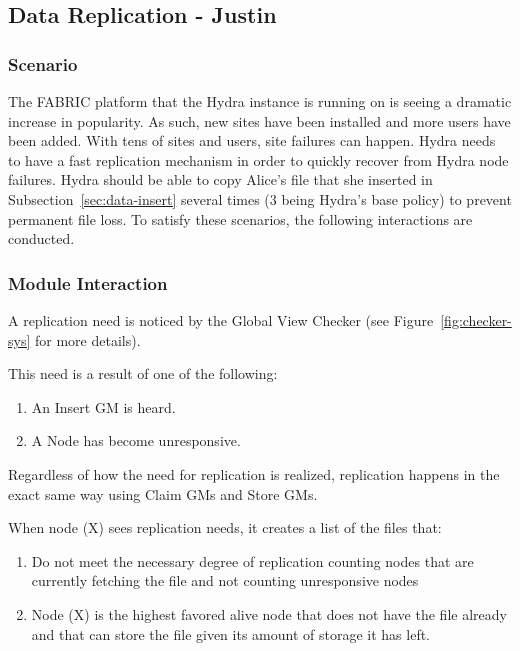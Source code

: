 \subsection{Data Replication - Justin} \label{sec:data-replicate}


\subsubsection{Scenario}
The FABRIC platform that the Hydra instance is running on is seeing a dramatic increase in popularity. As such, new sites have been installed and more users have been added. With tens of sites and users, site failures can happen.
Hydra needs to have a fast replication mechanism in order to quickly recover from Hydra node failures.
Hydra should be able to copy Alice's file that she inserted in Subsection~\ref{sec:data-insert} several times (3 being Hydra's base policy) to prevent permanent file loss. To satisfy these scenarios, the following interactions are conducted.


\subsubsection{Module Interaction}
A replication need is noticed by the Global View Checker (see Figure~\ref{fig:checker-sys} for more details).

This need is a result of one of the following: 
\begin{enumerate}
    \item An Insert GM is heard.
    \item A Node has become unresponsive.
\end{enumerate}

Regardless of how the need for replication is realized, replication happens in the exact same way using Claim GMs and Store GMs.

When node (X) sees replication needs, it creates a list of the files that:
\begin{enumerate}
    \item Do not meet the necessary degree of replication counting nodes that are currently fetching the file and not counting unresponsive nodes
    \item Node (X) is the highest favored alive node that does not have the file already and that can store the file given its amount of storage it has left.
\end{enumerate}

